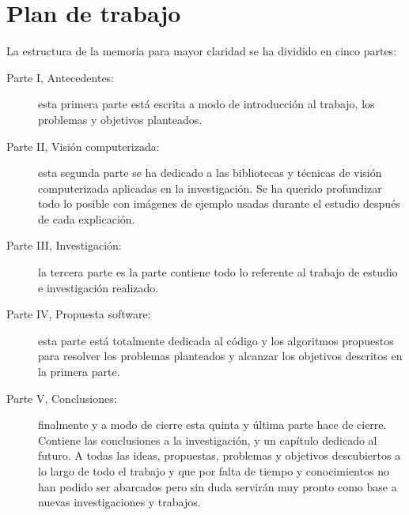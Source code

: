 \chapter{Plan de trabajo}
La estructura de la memoria para mayor claridad se ha dividido en
cinco partes:
\begin{description}
\item[Parte I, Antecedentes:] esta primera parte está escrita a modo
  de introducción al trabajo, los problemas y objetivos planteados.
\item[Parte II, Visión computerizada:] esta segunda parte se ha
  dedicado a las bibliotecas y técnicas de visión computerizada
  aplicadas en la investigación. Se ha querido profundizar todo lo
  posible con imágenes de ejemplo usadas durante el estudio después de
  cada explicación.
\item[Parte III, Investigación:] la tercera parte es la parte contiene
  todo lo referente al trabajo de estudio e investigación realizado.
\item[Parte IV, Propuesta software:] esta parte está totalmente
  dedicada al código y los algoritmos propuestos para resolver los
  problemas planteados y alcanzar los objetivos descritos en la
  primera parte.
\item[Parte V, Conclusiones:] finalmente y a modo de cierre esta
  quinta y última parte hace de cierre. Contiene las conclusiones a la
  investigación, y un capítulo dedicado al futuro. A todas las ideas,
  propuestas, problemas y objetivos descubiertos a lo largo de todo el
  trabajo y que por falta de tiempo y conocimientos no han podido ser
  abarcados pero sin duda servirán muy pronto como base a nuevas
  investigaciones y trabajos.
\end{description}